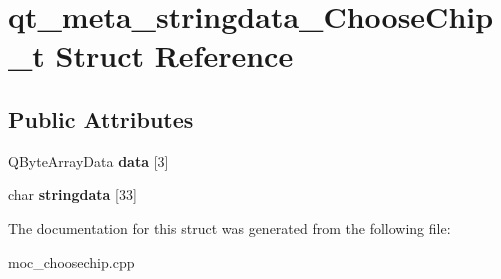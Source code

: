 \hypertarget{structqt__meta__stringdata__ChooseChip__t}{\section{qt\-\_\-meta\-\_\-stringdata\-\_\-\-Choose\-Chip\-\_\-t Struct Reference}
\label{structqt__meta__stringdata__ChooseChip__t}
}
\subsection*{Public Attributes}
\begin{DoxyCompactItemize}
\item 
\hypertarget{structqt__meta__stringdata__ChooseChip__t_a4e575ad4e41f87878c4772c85026e8c0}{Q\-Byte\-Array\-Data {\bfseries data} \mbox{[}3\mbox{]}}\label{structqt__meta__stringdata__ChooseChip__t_a4e575ad4e41f87878c4772c85026e8c0}

\item 
\hypertarget{structqt__meta__stringdata__ChooseChip__t_ae32f0f6157995ecc3b9d42511167006e}{char {\bfseries stringdata} \mbox{[}33\mbox{]}}\label{structqt__meta__stringdata__ChooseChip__t_ae32f0f6157995ecc3b9d42511167006e}

\end{DoxyCompactItemize}


The documentation for this struct was generated from the following file\-:\begin{DoxyCompactItemize}
\item 
moc\-\_\-choosechip.\-cpp\end{DoxyCompactItemize}
